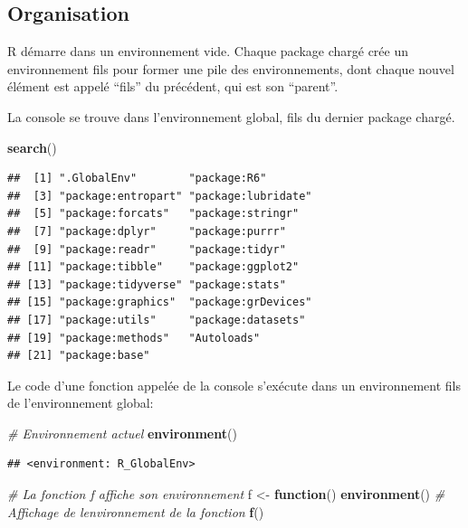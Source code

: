 \documentclass[
  12pt,
  french,
  a4paper,
  extrafontsizes,onecolumn,openright
  ]{memoir}
\newenvironment{Shaded}{\begin{snugshade}}{\end{snugshade}}
\newcommand{\CommentTok}[1]{\textcolor[rgb]{0.56,0.35,0.01}{\textit{#1}}}
\newcommand{\ControlFlowTok}[1]{\textcolor[rgb]{0.13,0.29,0.53}{\textbf{#1}}}
\newcommand{\FunctionTok}[1]{\textcolor[rgb]{0.13,0.29,0.53}{\textbf{#1}}}
\newcommand{\NormalTok}[1]{#1}
\newcommand{\OtherTok}[1]{\textcolor[rgb]{0.56,0.35,0.01}{#1}}
\begin{document}
\subsection{Organisation}\label{organisation}

R démarre dans un environnement vide.
Chaque package chargé crée un environnement fils pour former une pile des environnements, dont chaque nouvel élément est appelé \enquote{fils} du précédent, qui est son \enquote{parent}.

La console se trouve dans l'environnement global, fils du dernier package chargé.

\scriptsize

\begin{Shaded}
\begin{Highlighting}[]
\FunctionTok{search}\NormalTok{()}
\end{Highlighting}
\end{Shaded}

\begin{verbatim}
##  [1] ".GlobalEnv"        "package:R6"       
##  [3] "package:entropart" "package:lubridate"
##  [5] "package:forcats"   "package:stringr"  
##  [7] "package:dplyr"     "package:purrr"    
##  [9] "package:readr"     "package:tidyr"    
## [11] "package:tibble"    "package:ggplot2"  
## [13] "package:tidyverse" "package:stats"    
## [15] "package:graphics"  "package:grDevices"
## [17] "package:utils"     "package:datasets" 
## [19] "package:methods"   "Autoloads"        
## [21] "package:base"
\end{verbatim}

\normalsize

Le code d'une fonction appelée de la console s'exécute dans un environnement fils de l'environnement global:

\scriptsize

\begin{Shaded}
\begin{Highlighting}[]
\CommentTok{\# Environnement actuel}
\FunctionTok{environment}\NormalTok{()}
\end{Highlighting}
\end{Shaded}

\begin{verbatim}
## <environment: R_GlobalEnv>
\end{verbatim}

\begin{Shaded}
\begin{Highlighting}[]
\CommentTok{\# La fonction f affiche son environnement}
\NormalTok{f }\OtherTok{\textless{}{-}} \ControlFlowTok{function}\NormalTok{() }\FunctionTok{environment}\NormalTok{()}
\CommentTok{\# Affichage de l\textquotesingle{}environnement de la fonction}
\FunctionTok{f}\NormalTok{()}
\end{Highlighting}
\end{Shaded}
\end{document}
